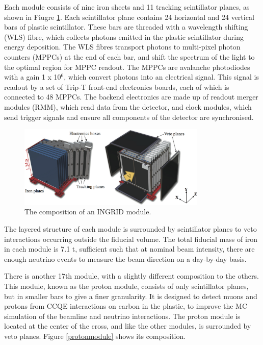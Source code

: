 Each module consists of nine iron sheets and 11 tracking scintillator planes, as shown in Fiugre \ref{ingridmodule}. Each scintillator plane contains 24 horizontal and 24 vertical bars of plastic scintillator. These bars are threaded with a wavelength shifting (WLS) fibre, which collects photons emitted in the plastic scintillator during energy deposition. The WLS fibres transport photons to multi-pixel photon counters (MPPCs) at the end of each bar, and shift the spectrum of the light to the optimal region for MPPC readout. The MPPCs are avalanche photodiodes with a gain 1 x 10$^6$, which convert photons into an electrical signal. This signal is readout by a set of Trip-T front-end electronics boards\cite{tript}, each of which is connected to 48 MPPCs. The backend electronics are made up of readout merger modules (RMM), which read data from the detector, and clock modules, which send trigger signals and ensure all components of the detector are synchronised.

\begin{figure}
\centering
\includegraphics*[width=0.8\textwidth,clip]{figs/ingridmodule}
\caption{The composition of an INGRID module.} \label{ingridmodule}
\end{figure}

The layered structure of each module is surrounded by scintillator planes to veto interactions occurring outside the fiducial volume. The total fiducial mass of iron in each module is 7.1 t, sufficient such that at nominal beam intensity, there are enough neutrino events to measure the beam direction on a day-by-day basis. 

There is another 17th module, with a slightly different composition to the others. This module, known as the proton module, consists of only scintillator planes, but in smaller bars to give a finer granularity. It is designed to detect muons and protons from CCQE interactions on carbon in the plastic, to improve the MC simulation of the beamline and neutrino interactions. The proton module is located at the center of the cross, and like the other modules, is surrounded by veto planes. Figure \ref{protonmodule} shows its composition.

